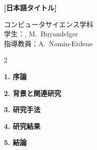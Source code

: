 \renewcommand{\figurename}{図}
\renewcommand{\tablename}{表}
\thispagestyle{plain}
\captionsetup{list=no, textfont=up}

\vspace*{-6mm}
\begin{center}
\textbf{\large [日本語タイトル]}\\[1mm]
\end{center}

\begin{flushright}
コンピュータサイエンス学科\\
学生：\studentID, M.~Buyandelger\\
指導教員：A.~Nomin-Erdene
\end{flushright}

\vspace{1mm}
\setlength{\columnsep}{7mm}
\begin{multicols*}{2}
\sloppy

\noindent\textbf{1. 序論}


\noindent\textbf{2. 背景と関連研究}


\noindent\textbf{3. 研究手法}


\noindent\textbf{4. 研究結果}


\noindent\textbf{5. 結論}

\end{multicols*}
